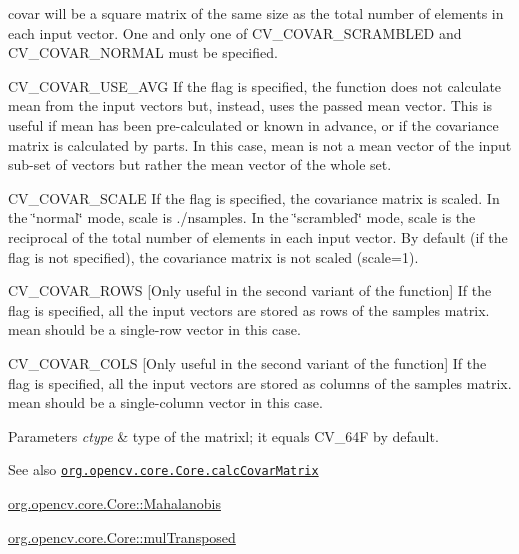 {\ttfamily covar} will be a square matrix of the same size as the total number of elements in each input vector. One and only one of {\ttfamily C\+V\+\_\+\+C\+O\+V\+A\+R\+\_\+\+S\+C\+R\+A\+M\+B\+L\+ED} and {\ttfamily C\+V\+\_\+\+C\+O\+V\+A\+R\+\_\+\+N\+O\+R\+M\+AL} must be specified.


\begin{DoxyItemize}
\item C\+V\+\_\+\+C\+O\+V\+A\+R\+\_\+\+U\+S\+E\+\_\+\+A\+VG If the flag is specified, the function does not calculate {\ttfamily mean} from the input vectors but, instead, uses the passed {\ttfamily mean} vector. This is useful if {\ttfamily mean} has been pre-\/calculated or known in advance, or if the covariance matrix is calculated by parts. In this case, {\ttfamily mean} is not a mean vector of the input sub-\/set of vectors but rather the mean vector of the whole set. 
\item C\+V\+\_\+\+C\+O\+V\+A\+R\+\_\+\+S\+C\+A\+LE If the flag is specified, the covariance matrix is scaled. In the \char`\"{}normal\char`\"{} mode, {\ttfamily scale} is {./nsamples}. In the \char`\"{}scrambled\char`\"{} mode, {\ttfamily scale} is the reciprocal of the total number of elements in each input vector. By default (if the flag is not specified), the covariance matrix is not scaled ({\ttfamily scale=1}). 
\item C\+V\+\_\+\+C\+O\+V\+A\+R\+\_\+\+R\+O\+WS \mbox{[}Only useful in the second variant of the function\mbox{]} If the flag is specified, all the input vectors are stored as rows of the {\ttfamily samples} matrix. {\ttfamily mean} should be a single-\/row vector in this case. 
\item C\+V\+\_\+\+C\+O\+V\+A\+R\+\_\+\+C\+O\+LS \mbox{[}Only useful in the second variant of the function\mbox{]} If the flag is specified, all the input vectors are stored as columns of the {\ttfamily samples} matrix. {\ttfamily mean} should be a single-\/column vector in this case. 
\end{DoxyItemize}
\begin{DoxyParams}{Parameters}
{\em ctype} & type of the matrixl; it equals \textquotesingle{}C\+V\+\_\+64F\textquotesingle{} by default.\\
\hline
\end{DoxyParams}
\begin{DoxySeeAlso}{See also}
\href{http://docs.opencv.org/modules/core/doc/operations_on_arrays.html#calccovarmatrix}{\tt org.\+opencv.\+core.\+Core.\+calc\+Covar\+Matrix} 

\mbox{\hyperlink{classorg_1_1opencv_1_1core_1_1_core_ae6da41381cc2fc87daa1a14a2c476781}{org.\+opencv.\+core.\+Core\+::\+Mahalanobis}} 

\mbox{\hyperlink{classorg_1_1opencv_1_1core_1_1_core_aecfddbae696272a338eb12056603d4e9}{org.\+opencv.\+core.\+Core\+::mul\+Transposed}} 
\end{DoxySeeAlso}
\mbox{\label{classorg_1_1opencv_1_1core_1_1_core_ac9a38bf2bcad4daa87e017dceb927bc3}} 
